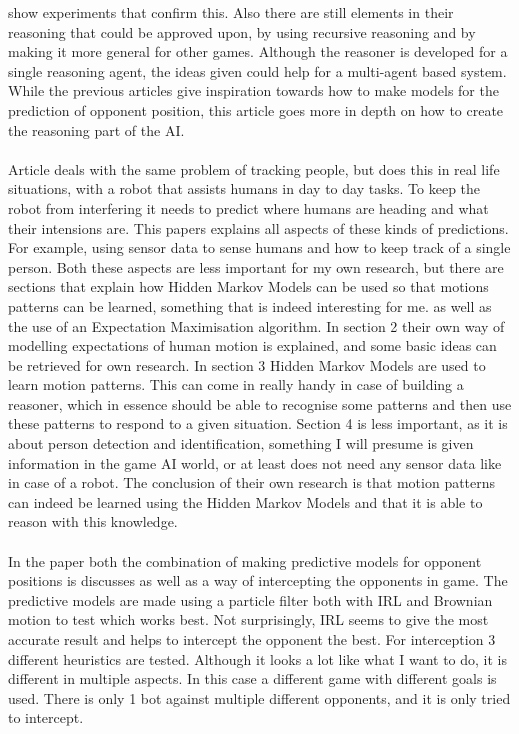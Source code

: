 \documentclass[a4paper, 12pt]{article}
\begin{document}
show experiments that confirm this. Also there are still elements in their
reasoning that could be approved upon, by using recursive reasoning and by
making it more general for other games. Although the reasoner is developed for a
single reasoning agent, the ideas given could help for a multi-agent based
system. While the previous articles give inspiration towards how to make models
for the prediction of opponent position, this article goes more in depth on how
to create the reasoning part of the AI.  \\\\ Article
\citep{Bennewitz05learningmotion} deals with the same problem of tracking
people, but does this in real life situations, with a robot that assists humans
in day to day tasks. To keep the robot from interfering it needs to predict
where humans are heading and what their intensions are. This papers explains all
aspects of these kinds of predictions. For example, using sensor data to sense
humans and how to keep track of a single person. Both these aspects are less
important for my own research, but there are sections that explain how Hidden
Markov Models can be used so that motions patterns can be learned, something
that is indeed interesting for me. as well as the use of an Expectation
Maximisation algorithm. In section 2 their own way of modelling expectations of
human motion is explained, and some basic ideas can be retrieved for own
research. In section 3 Hidden Markov Models are used to learn motion patterns.
This can come in really handy in case of building a reasoner, which in essence
should be able to recognise some patterns and then use these patterns to respond
to a given situation. Section 4 is less important, as it is about person
detection and identification, something I will presume is given information in
the game AI world, or at least does not need any sensor data like in case of a
robot.  The conclusion of their own research is that motion patterns can indeed
be learned using the Hidden Markov Models and that it is able to reason with
this knowledge.  \\\\ In the paper \citep{6374144} both the combination of
making predictive models for opponent positions is discusses as well as a way of
intercepting the opponents in game. The predictive models are made using a
particle filter both with IRL and Brownian motion  to test which works best. Not
surprisingly, IRL seems to give the most accurate result and helps to intercept
the opponent the best. For interception 3 different heuristics are tested.
Although it looks a lot like what I want to do, it is different in multiple
aspects. In this case a different game with different goals is used. There is
only 1 bot against multiple different opponents, and it is only tried to
intercept.
\end{document}
